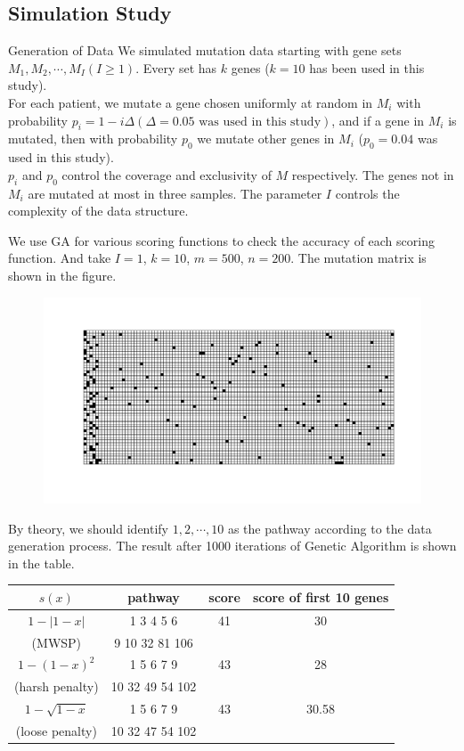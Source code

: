 \documentclass[xcolor=dvipsnames]{beamer}
\begin{document}
\subsection{Simulation Study}
\begin{frame}{Generation of Data}
We simulated mutation data starting with gene sets $M_1,M_2,\cdots,M_I (I\geqslant 1)$. Every set has $k$ genes ($k=10$ has been used in this study).\\
For each patient, we mutate a gene chosen uniformly at random in $M_i$ with probability $p_i=1-i\Delta(\Delta=0.05 \text{ was used in this study})$, and if a gene in $M_i$ is mutated, then with probability $p_0$ we mutate other genes in $M_i$ ($p_0=0.04$ was used in this study).\\
$p_i$ and $p_0$ control the coverage and exclusivity of $M$ respectively. The genes not in $M_i$ are mutated at most in three samples. The parameter $I$ controls the complexity of the data structure.\\
\end{frame}
\begin{frame}
We use GA for various scoring functions to check the accuracy of each scoring function. And take $I=1$, $k=10$, $m=500$, $n=200$. The mutation matrix is shown in the figure.\\
\begin{figure}
\centering
\includegraphics[width=0.8\linewidth]{simdata.png}
\end{figure}
\end{frame}
\begin{frame}
By theory, we should identify $1,2,\cdots,10$ as the pathway according to the data generation process. The result after 1000 iterations of Genetic Algorithm is shown in the table.\\
\begin{table}
\centering
\begin{tabular}{c|c|c|c}
\hline
$s(x)$&pathway&score&score of first 10 genes\\
\hline
$1-|1-x|$&  1   3   4   5   6 &41&30\\
(MWSP)& 9  10  32  81 106&&\\
$1-(1-x)^2$&1   5   6   7   9&43&28\\
(harsh penalty)&10  32  49  54 102&&\\
$1-\sqrt{1-x}$&1   5   6   7   9&43&30.58\\
(loose penalty)&10  32  47  54 102&&\\
\end{tabular}
\end{table}
\end{frame}
\end{document}

